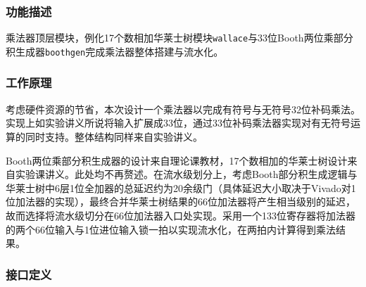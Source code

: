 \documentclass[UTF-8,twoside,c5size]{ctexart}
\begin{document}
	\subsubsection{功能描述}
	
	乘法器顶层模块，例化17个数相加华莱士树模块\texttt{wallace}与33位Booth两位乘部分积生成器\texttt{boothgen}完成乘法器整体搭建与流水化。
	
	\subsubsection{工作原理}
	
	考虑硬件资源的节省，本次设计一个乘法器以完成有符号与无符号32位补码乘法。实现上如实验讲义所说将输入扩展成33位，通过33位补码乘法器实现对有无符号运算的同时支持。整体结构同样来自实验讲义。
	
	Booth两位乘部分积生成器的设计来自理论课教材，17个数相加的华莱士树设计来自实验课讲义。此处均不再赘述。在流水级划分上，考虑Booth部分积生成逻辑与华莱士树中6层1位全加器的总延迟约为20余级门（具体延迟大小取决于Vivado对1位加法器的实现），最终合并华莱士树结果的66位加法器将产生相当级别的延迟，故而选择将流水级切分在66位加法器入口处实现。采用一个133位寄存器将加法器的两个66位输入与1位进位输入锁一拍以实现流水化，在两拍内计算得到乘法结果。
	
	\subsubsection{接口定义}
	
\end{document}
